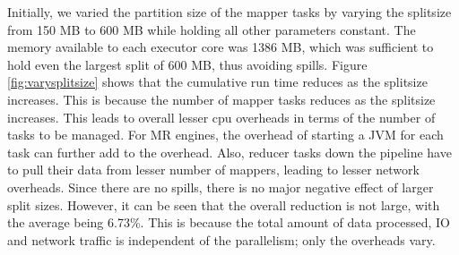 Initially, we varied the partition size of the mapper tasks by varying the splitsize from 150 MB to 600 MB while holding all other parameters constant. The memory available to each executor core was 1386 MB, which was sufficient to hold even the largest split of 600 MB, thus avoiding spills. Figure \ref{fig:varysplitsize} shows that the cumulative run time reduces as the splitsize increases. This is because the number of mapper tasks reduces as the splitsize increases. This leads to overall lesser cpu overheads in terms of the number of tasks to be managed. For MR engines, the overhead of starting a JVM for each task can further add to the overhead. Also, reducer tasks down the pipeline have to pull their data from lesser number of mappers, leading to lesser network overheads. Since there are no spills, there is no major negative effect of larger split sizes. However, it can be seen that the overall reduction is not large, with the average being 6.73\%. This is because the total amount of data processed, IO and network traffic is independent of the parallelism; only the overheads vary. 

